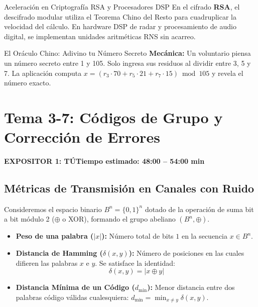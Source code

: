 \documentclass[11pt,a4paper]{article}
\newcommand{\badgeTu}{\colorbox{exp1bg}{\textcolor{exp1fg}{\bfseries\sffamily\footnotesize EXPOSITOR 1: TÚ}}}
\begin{document}
\begin{aplicacion}{Aceleración en Criptografía RSA y Procesadores DSP}
En el cifrado \textbf{RSA}, el descifrado modular utiliza el Teorema Chino del Resto para cuadruplicar la velocidad del cálculo. En hardware DSP de radar y procesamiento de audio digital, se implementan unidades aritméticas RNS sin acarreo.
\end{aplicacion}

\begin{minijuego}{El Oráculo Chino: Adivino tu Número Secreto}
\textbf{Mecánica:} Un voluntario piensa un número secreto entre 1 y 105. Solo ingresa sus residuos al dividir entre 3, 5 y 7. La aplicación computa $x = (r_3 \cdot 70 + r_5 \cdot 21 + r_7 \cdot 15) \bmod 105$ y revela el número exacto.
\end{minijuego}

\newpage

\section{Tema 3-7: Códigos de Grupo y Corrección de Errores}
\noindent\badgeTu \hfill \textbf{Tiempo estimado: 48:00 -- 54:00 min}

\subsection{Métricas de Transmisión en Canales con Ruido}
Consideremos el espacio binario $B^n = \{0, 1\}^n$ dotado de la operación de suma bit a bit módulo 2 ($\oplus$ o XOR), formando el grupo abeliano $(B^n, \oplus)$.

\begin{definicion}
\begin{itemize}[noitemsep]
  \item \textbf{Peso de una palabra ($|x|$):} Número total de bits $1$ en la secuencia $x \in B^n$.
  \item \textbf{Distancia de Hamming ($\delta(x, y)$):} Número de posiciones en las cuales difieren las palabras $x$ e $y$. Se satisface la identidad:
  \begin{equation}
    \delta(x, y) = |x \oplus y|
  \end{equation}
  \item \textbf{Distancia Mínima de un Código ($d_{\min}$):} Menor distancia entre dos palabras código válidas cualesquiera: $d_{\min} = \min_{x \neq y} \delta(x, y)$.
\end{itemize}
\end{definicion}
\end{document}
